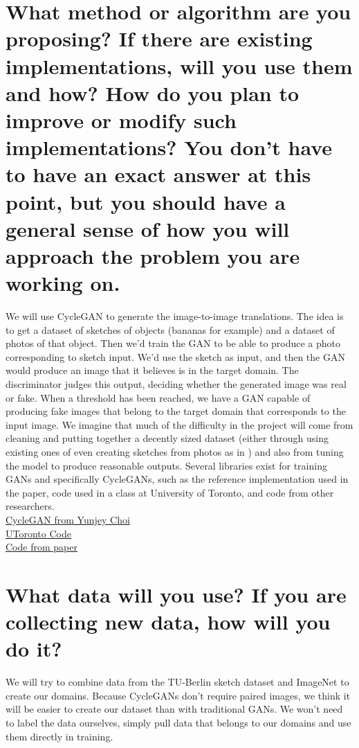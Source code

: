 \documentclass{article}
\begin{document}
\section{What method or algorithm are you proposing? If there are existing implementations, will you use them and how? How do you plan to improve or modify such implementations? You don't have to have an exact answer at this point, but you should have a general sense of how you will approach the problem you are working on. }

We will use CycleGAN to generate the image-to-image translations.
The idea is to get a dataset of sketches of objects (bananas for example) and a dataset of photos of that object.
Then we'd train the GAN to be able to produce a photo corresponding to sketch input. 
We'd use the sketch as input, and then the GAN would produce an image that it believes is in the target domain. 
The discriminator judges this output, deciding whether the generated image was real or fake.
When a threshold has been reached, we have a GAN capable of producing fake images that belong to the target domain that corresponds to the input image.
We imagine that much of the difficulty in the project will come from cleaning and putting together a decently sized dataset (either through using existing ones of even creating sketches from photos as in \cite{pix2pix}) and also from tuning the model to produce reasonable outputs.
Several libraries exist for training GANs and specifically CycleGANs, such as the reference implementation used in the paper, code used in a class at University of Toronto, and code from other researchers. \\
\href{https://github.com/yunjey/mnist-svhn-transfer}{CycleGAN from Yunjey Choi} \\
\href{www.cs.toronto.edu/~rgrosse/courses/csc321_2018/assignments/a4-code.zip}{UToronto Code} \\
\href{https://github.com/junyanz/pytorch-CycleGAN-and-pix2pix}{Code from paper} \\

\section{What data will you use? If you are collecting new data, how will you do it?}

We will try to combine data from the TU-Berlin sketch dataset \cite{tu-berlin-sketch} and ImageNet \cite{imagenet} to create our domains. 
Because CycleGANs don't require paired images, we think it will be easier to create our dataset than with traditional GANs.
We won't need to label the data ourselves, simply pull data that belongs to our domains and use them directly in training.
\end{document}
